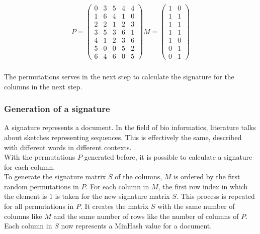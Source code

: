\begin{equation}
    \begin{split}
        P = 
        \begin{pmatrix}
            0 & 3 & 5 & 4 & 4 \\
            1 & 6 & 4 & 1 & 0 \\
            2 & 2 & 1 & 2 & 3 \\
            3 & 5 & 3 & 6 & 1 \\
            4 & 1 & 2 & 3 & 6 \\
            5 & 0 & 0 & 5 & 2 \\
            6 & 4 & 6 & 0 & 5
        \end{pmatrix}
        M = 
        \begin{pmatrix}
            1 & 0 \\
            1 & 1 \\
            1 & 1 \\
            1 & 1 \\
            1 & 0 \\
            0 & 1 \\
            0 & 1
        \end{pmatrix}   
    \end{split}
\end{equation} \\

The permutations serves in the next step to calculate the signature for the columns in the next step.\\

\subsubsection{Generation of a signature}

A signature represents a document. In the field of bio informatics, literature talks about sketches representing sequences. This is effectively the same, described with different words in different contexts.\\

With the permutations $ P $ generated before, it is possible to calculate a signature for each column.\\

To generate the signature matrix $ S $ of the columns, $ M $ is ordered by the first random permutations in $ P $. For each column in $ M $, the first row index in which the element is $ 1 $ is taken for the new signature matrix $ S $. This process is repeated for all permutations in $ P $.  It creates the matrix $ S $ with the same number of columns like $ M $ and the same number of rows like the number of columns of $ P $. Each column in $ S $ now represents a MinHash value for a document.\\


